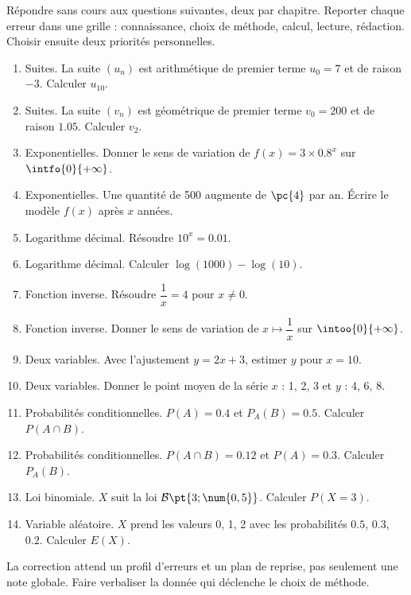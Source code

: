\begin{activity}
Répondre sans cours aux  questions suivantes, deux par chapitre. Reporter chaque erreur dans une grille : connaissance, choix de méthode, calcul, lecture, rédaction. Choisir ensuite deux priorités personnelles.
\begin{enumerate}
\item Suites. La suite $(u_n)$ est arithmétique de premier terme $u_0=7$ et de raison $-3$. Calculer $u_{10}$. 
\item Suites. La suite $(v_n)$ est géométrique de premier terme $v_0=200$ et de raison $\num{1,05}$. Calculer $v_2$. 
\item Exponentielles. Donner le sens de variation de $f(x)=3\times\num{0,8}^x$ sur $\intfo{0}{+\infty}$. 
\item Exponentielles. Une quantité de 500 augmente de $\pc{4}$ par an. Écrire le modèle $f(x)$ après $x$ années. 
\item Logarithme décimal. Résoudre $10^x=\num{0,01}$. 
\item Logarithme décimal. Calculer $\log(1000)-\log(10)$. 
\item Fonction inverse. Résoudre $\dfrac1x=4$ pour $x\neq0$. 
\item Fonction inverse. Donner le sens de variation de $x\mapsto\dfrac1x$ sur $\intoo{0}{+\infty}$. 
\item Deux variables. Avec l'ajustement $y=2x+3$, estimer $y$ pour $x=10$. 
\item Deux variables. Donner le point moyen de la série $x$ : 1, 2, 3 et $y$ : 4, 6, 8. 
\item Probabilités conditionnelles. $P(A)=\num{0,4}$ et $P_A(B)=\num{0,5}$. Calculer $P(A\cap B)$. 
\item Probabilités conditionnelles. $P(A\cap B)=\num{0,12}$ et $P(A)=\num{0,3}$. Calculer $P_A(B)$. 
\item Loi binomiale. $X$ suit la loi $\mathcal B\pt{3;\num{0,5}}$. Calculer $P(X=3)$. 
\item Variable aléatoire. $X$ prend les valeurs 0, 1, 2 avec les probabilités $\num{0,5}$, $\num{0,3}$, $\num{0,2}$. Calculer $E(X)$. 
\end{enumerate}

\end{activity}
\begin{solution}La correction attend un profil d'erreurs et un plan de reprise, pas seulement une note globale. Faire verbaliser la donnée qui déclenche le choix de méthode.\end{solution}

